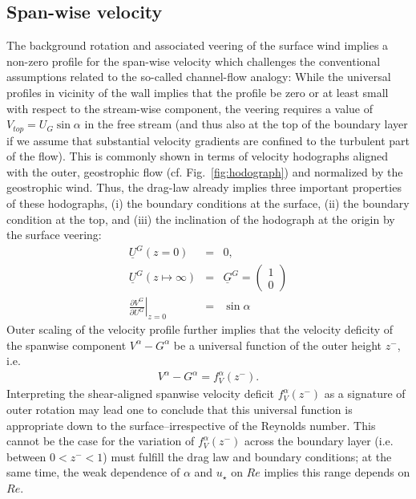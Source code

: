 \documentclass[a4paper,11pt]{amsart}
\begin{document}
\subsection{Span-wise velocity}
%
%
The background rotation and associated veering of the surface wind implies a non-zero profile for the span-wise
velocity which challenges the conventional assumptions related to the so-called channel-flow analogy:
%
While the universal profiles in vicinity of the wall implies that the profile be zero or at least small with respect to the stream-wise
component, the veering requires a value of $V_{top}=U_G\sin\alpha$ in the free stream (and thus also at the top of the boundary layer if we assume
that substantial velocity gradients are confined to the turbulent part of the flow). 
%
This is commonly shown in terms of velocity hodographs aligned with the outer, geostrophic flow (cf. Fig.~\ref{fig:hodograph}) and normalized by
the geostrophic wind. 
%
Thus, the drag-law already implies three important properties of these hodographs,
(i) the boundary conditions at the surface,
(ii) the boundary condition at the top, and
(iii) the inclination of the hodograph at the origin by the surface veering:
\begin{subequations} 
\begin{eqnarray} 
 \underline{U}^{G}(z=0) &=& 0,\\ 
 \underline{U}^{G}(z\mapsto\infty) &=& \underline{G}^G = \left(\begin{array}{c}1\\0\end{array}\right) \\
   \left.\frac{\partial V^G}{\partial U^G}\right|_{z=0} &=& \sin\alpha
\end{eqnarray} 
\end{subequations} 
%
Outer scaling of the velocity profile further implies that the velocity deficity of the spanwise component $V^\alpha-G^\alpha$
be a universal function of the outer height $z^-$, i.e.  
\begin{eqnarray}
  V^\alpha-G^\alpha = f^\alpha_V(z^-).  
\end{eqnarray}
%
Interpreting the shear-aligned spanwise velocity deficit $f_{V}^{\alpha}(z^-)$ as 
a signature of outer rotation may lead one to conclude that this universal function
is appropriate down to the surface--irrespective of the Reynolds number.
%
This cannot be the case for the variation of $f_{V}^{\alpha}(z^-)$ across the boundary layer (i.e. between $0<z^-<1$)
must fulfill the drag law and boundary conditions;
at the same time, the weak dependence of $\alpha$ and $u_\star$ on $Re$ implies this range depends on $Re$.
%
%
\end{document}
